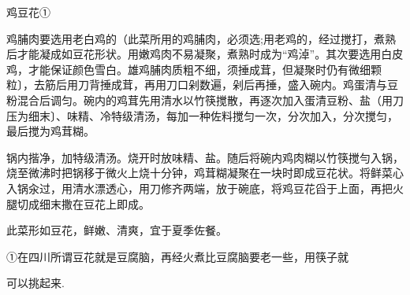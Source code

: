 \begin{recipe}{鸡豆花①}

\ingredients


\cooking

\step 鸡脯肉要选用老白鸡的（此菜所用的鸡脯肉，必须选;用老鸡的，经过搅打，煮熟后才能凝成如豆花形状。用嫩鸡肉不易凝聚，煮熟时成为“鸡淖”。其次要选用白皮鸡，才能保证颜色雪白。雄鸡脯肉质粗不细，须捶成茸，但凝聚时仍有微细颗粒〕，去筋后用刀背捶成茸，再用刀口剁数遍，剁后再捶，盛入碗内。鸡蛋清与豆粉混合后调匀。碗内的鸡茸先用清水以竹筷搅散，再逐次加入蛋清豆粉、盐（用刀压为细末〕、味精、冷特级清汤，每加一种佐料搅匀一次，分次加入，分次搅匀，最后搅为鸡茸糊。

\step 锅内揩净，加特级清汤。烧开时放味精、盐。随后将碗内鸡肉糊以竹筷搅勻入锅，烧至微沸时把锅移于微火上烧十分钟，鸡茸糊凝聚在一块时即成豆花状。将鲜菜心入锅汆过，用清水漂透心，用刀修齐两端，放于碗底，将鸡豆花舀于上面，再把火腿切成细末撒在豆花上即成。

\notes

此菜形如豆花，鲜嫩、清爽，宜于夏季佐餐。

①在四川所谓豆花就是豆腐脑，再经火煮比豆腐脑要老一些，用筷子就

可以挑起来.

\end{recipe}

